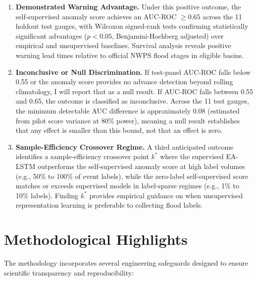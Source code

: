 \documentclass[12pt]{report}
\begin{document}
\begin{enumerate}
  \item \textbf{Demonstrated Warning Advantage.} Under this positive outcome, the self-supervised anomaly score achieves an AUC-ROC $\ge 0.65$ across the 11 holdout test gauges, with Wilcoxon signed-rank tests confirming statistically significant advantages ($p < 0.05$, Benjamini-Hochberg adjusted) over empirical and unsupervised baselines. Survival analysis reveals positive warning lead times relative to official NWPS flood stages in eligible basins.
  \item \textbf{Inconclusive or Null Discrimination.} If test-panel AUC-ROC falls below 0.55 or the anomaly score provides no advance detection beyond rolling climatology, I will report that as a null result. If AUC-ROC falls between 0.55 and 0.65, the outcome is classified as inconclusive. Across the 11 test gauges, the minimum detectable AUC difference is approximately 0.08 (estimated from pilot score variance at 80\% power), meaning a null result establishes that any effect is smaller than this bound, not that an effect is zero.
  \item \textbf{Sample-Efficiency Crossover Regime.} A third anticipated outcome identifies a sample-efficiency crossover point $k^*$ where the supervised EA-LSTM outperforms the self-supervised anomaly score at high label volumes (e.g., 50\% to 100\% of event labels), while the zero-label self-supervised score matches or exceeds supervised models in label-sparse regimes (e.g., 1\% to 10\% labels). Finding $k^*$ provides empirical guidance on when unsupervised representation learning is preferable to collecting flood labels.
\end{enumerate}

\section{Methodological Highlights}

The methodology incorporates several engineering safeguards designed to ensure scientific transparency and reproducibility:
\end{document}
